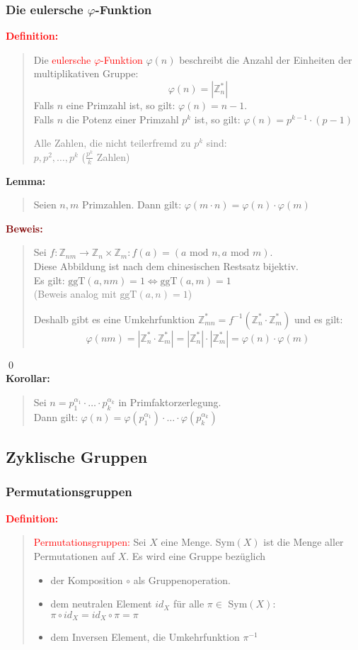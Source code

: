 \documentclass{article}
\newcommand{\red}[1]{\textcolor{red}{#1}}
\newcommand{\gray}[1]{\textcolor{gray}{#1}}
\newcommand{\dgr}[1]{\textcolor{dgr}{#1}}
\newcommand{\maroon}[1]{\textcolor{maroon}{#1}}
\newcommand{\de}[1]{\red{\textbf{Definition: }}\begin{quote}#1\end{quote}}
\newcommand{\lem}[1]{\dgr{\textbf{Lemma: }}\begin{quote}#1\end{quote}}
\newcommand{\co}[1]{\dgr{\textbf{Korollar: }}\begin{quote}#1\end{quote}}
\newcommand{\pr}[1]{\maroon{\textbf{Beweis: }}\begin{quote}#1\end{quote}\qed}
\newcommand{\Z}{\mathbb{Z}}
\renewcommand{\mod}{\text{ mod }}
\newcommand{\ggt}{\text{ggT}}
\begin{document}
\subsubsection{\texorpdfstring{Die eulersche $\varphi$-Funktion}{Die eulersche phi-Funktion}}

\de{
    Die \red{eulersche $\varphi$-Funktion} $\varphi(n)$ beschreibt die Anzahl der Einheiten der multiplikativen Gruppe:
    $$\varphi(n) = |\Z_n^*|$$
    Falls $n$ eine Primzahl ist, so gilt: $\varphi(n) = n - 1$.\\
    Falls $n$ die Potenz einer Primzahl $p^k$ ist, so gilt: $\varphi(n) = p^{k-1} \cdot (p-1)$

    \gray{Alle Zahlen, die nicht teilerfremd zu $p^k$ sind:\\
    $p, p^2, \dots, p^k$ ($\frac{p^k}{k}$ Zahlen)}
}

\lem{
    Seien $n,m$ Primzahlen. Dann gilt: $\varphi(m \cdot n) = \varphi(n) \cdot \varphi(m)$
}

\pr{
    Sei $f: \Z_{nm} \to \Z_n \times \Z_m: f(a) = (a \mod n, a \mod m)$.\\
    Diese Abbildung ist nach dem chinesischen Restsatz bijektiv.\\
    Es gilt: $\ggt(a,nm) = 1 \iff \ggt(a,m) = 1$\\
    \gray{(Beweis analog mit $\ggt(a,n) = 1$)}

    Deshalb gibt es eine Umkehrfunktion $\Z_{mn}^* = f^{-1}(\Z_n^* \cdot \Z_m^*)$ und es gilt:
    \[
        \varphi(nm) = |\Z_n^* \cdot \Z_m^*| = |\Z_n^*| \cdot |\Z_m^*| = \varphi(n) \cdot \varphi(m)
    \]
}\\
\co{
    Sei $n = p_1^{\alpha_1} \cdot \dots \cdot p_k^{\alpha_k}$ in Primfaktorzerlegung.\\
    Dann gilt: $\varphi(n) = \varphi(p_1^{\alpha_1}) \cdot \dots \cdot \varphi(p_k^{\alpha_k})$
}

\subsection{Zyklische Gruppen}

\subsubsection{Permutationsgruppen}
\de{
    \red{Permutationsgruppen:} Sei $X$ eine Menge. Sym$(X)$ ist die Menge aller Permutationen auf $X$.
    Es wird eine Gruppe bezüglich
    \begin{itemize}
        \item der Komposition $\circ$ als Gruppenoperation.
        \item dem neutralen Element $id_X$ für alle $\pi \in$ Sym$(X)$: $\pi \circ id_X = id_X \circ \pi = \pi$
        \item dem Inversen Element, die Umkehrfunktion $\pi^{-1}$
    \end{itemize}
}
\end{document}

